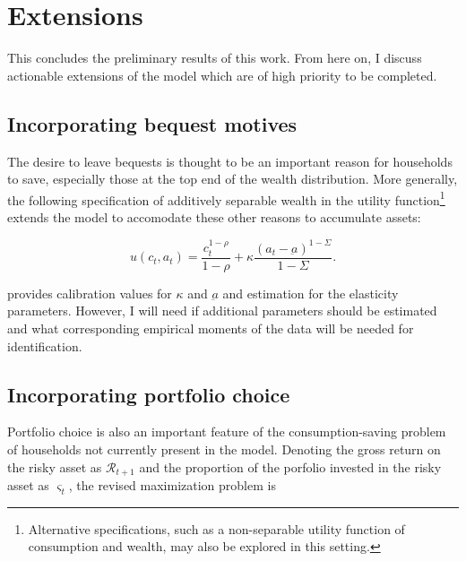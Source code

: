 \documentclass[\econtexRoot/Chp1proposal]{subfiles}
\begin{document}
\hypertarget{extensions}{}
\section{Extensions}\notinsubfile{\label{sec:extensions}}

This concludes the preliminary results of this work. From here on, I discuss actionable extensions of the model which are of high priority to be completed.

\subsection{Incorporating bequest motives}

\par The desire to leave bequests is thought to be an important reason for households to save, especially those at the top end of the wealth distribution. More generally, the following specification of additively separable wealth in the utility function\footnote{Alternative specifications, such as a non-separable utility function of consumption and wealth, may also be explored in this setting.} extends the model to accomodate these other reasons to accumulate assets:

$$u(c_t, a_t) = \frac{c_{t}^{1-\rho}}{1-\rho} + \kappa \frac{(a_{t}-\underbar{a})^{1-\Sigma}}{1-\Sigma}.$$

\par \cite{ls2019} provides calibration values for $\kappa$ and $\underbar{a}$ and estimation for the elasticity parameters. However, I will need if additional parameters should be estimated and what corresponding empirical moments of the data will be needed for identification.


\subsection{Incorporating portfolio choice}

\par Portfolio choice is also an important feature of the consumption-saving problem of households not currently present in the model. Denoting the gross return on the risky asset as $\mathcal{R}_{t+1}$ and the proportion of the porfolio invested in the risky asset as $\varsigma_t$, the revised maximization problem is
\end{document}
